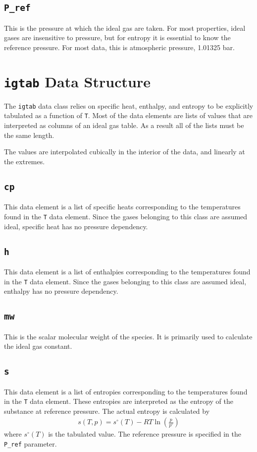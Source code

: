 \subsection{\texttt{P\_ref}}
This is the pressure at which the ideal gas are taken.  For most properties, ideal gases are insensitive to pressure, but for entropy it is essential to know the reference pressure.  For most data, this is atmospheric pressure, 1.01325 bar.

\section{\texttt{igtab} Data Structure}
The \verb|igtab| data class relies on specific heat, enthalpy, and entropy to be explicitly tabulated as a function of \verb|T|.  Most of the data elements are lists of values that are interpreted as columns of an ideal gas table.  As a result all of the lists must be the same length.

The values are interpolated cubically in the interior of the data, and linearly at the extremes.  

\subsection{\texttt{cp}}
This data element is a list of specific heats corresponding to the temperatures found in the \verb|T| data element.  Since the gases belonging to this class are assumed ideal, specific heat has no pressure dependency.

\subsection{\texttt{h}}
This data element is a list of enthalpies corresponding to the temperatures found in the \verb|T| data element.  Since the gases belonging to this class are assumed ideal, enthalpy has no pressure dependency.

\subsection{\texttt{mw}}
This is the scalar molecular weight of the species.  It is primarily used to calculate the ideal gas constant.

\subsection{\texttt{s}}
This data element is a list of entropies corresponding to the temperatures found in the \verb|T| data element.  These entropies are interpreted as the entropy of the substance at reference pressure.  The actual entropy is calculated by
\begin{align}
s(T,p) = s^\circ(T) - R T \ln\left(\frac{p}{p^\circ}\right)
\end{align}
where $s^\circ(T)$ is the tabulated value.  The reference pressure is specified in the \verb|P_ref| parameter.

